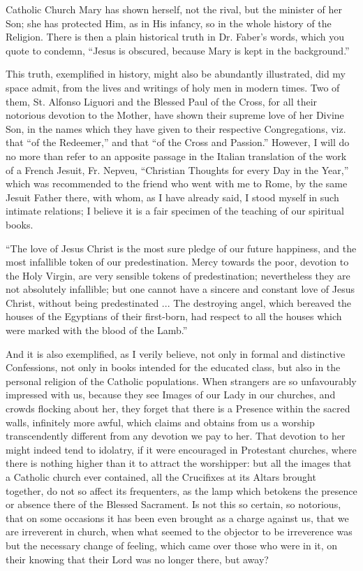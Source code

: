 Catholic Church Mary has shown herself, not the rival, but the minister
of her Son; she has protected Him, as in His infancy, so in the whole
history of the Religion. There is then a plain historical truth in Dr.
Faber's words, which you quote to condemn, ``Jesus is obscured,
because Mary is kept in the background.''

This truth, exemplified in history, might also be abundantly
illustrated, did my space admit, from the lives and writings of holy men
in modern times. Two of them, St. Alfonso Liguori and the Blessed Paul
of the Cross, for all their notorious devotion to the Mother, have shown
their supreme love of her Divine Son, in the names which they have given
to their respective Congregations, viz. that ``of the
Redeemer,'' and that ``of the Cross and Passion.'' However,
I will do no more than refer to an apposite passage in the Italian
translation of the work of a French Jesuit, Fr. Nepveu, ``Christian
Thoughts for every Day in the Year,'' which was recommended to
the friend who went with me to Rome, by the same Jesuit Father there,
with whom, as I have already said, I stood myself in such intimate
relations; I believe it is a fair specimen of the teaching of our
spiritual books.

``The love of Jesus Christ is the most sure pledge of our future
happiness, and the most infallible token of our predestination. Mercy
towards the poor, devotion to the Holy Virgin, are very sensible tokens
of predestination; nevertheless they are not absolutely infallible; but
one cannot have a sincere and constant love of Jesus Christ, without
being predestinated ... The destroying angel, which bereaved the houses
of the Egyptians of their first-born, had respect to all the houses
which were marked with the blood of the Lamb.''

And it is also exemplified, as I verily believe, not only in formal
and distinctive Confessions, not only in books intended for the educated
class, but also in the personal religion of the Catholic populations.
When strangers are so unfavourably impressed with us, because they see
Images of our Lady in our churches, and crowds flocking about her, they
forget that there is a Presence within the sacred walls, infinitely more
awful, which claims and obtains from us a worship transcendently
different from any devotion we pay to her. That devotion to her might
indeed tend to idolatry, if it were encouraged in Protestant churches,
where there is nothing higher than it to attract the worshipper: but all
the images that a Catholic church ever contained, all the Crucifixes at
its Altars brought together, do not so affect its frequenters, as the
lamp which betokens the presence or absence there of the Blessed
Sacrament. Is not this so certain, so notorious, that on some occasions
it has been even brought as a charge against us, that we are irreverent
in church, when what seemed to the objector to be irreverence was but
the necessary change of feeling, which came over those who were in it,
on their knowing that their Lord was no longer there, but away?

